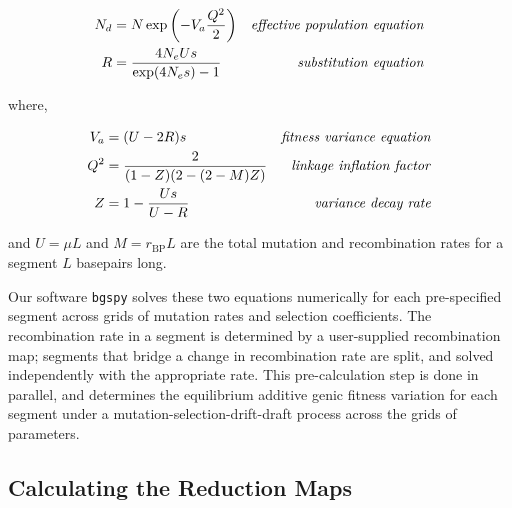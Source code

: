 \documentclass[11pt]{article}
\begin{document}
\begin{align}
  \label{eq:}
  {N}_{d} &= N \exp \left( -V_a \frac{Q^2}{2} \right) & \text{\emph{effective population equation}} \\
  R &= \frac{4N_eU s}{\exp(4 N_e s)-1}  & \text{\emph{substitution equation}} 
\end{align}

where,

\begin{align}
  V_a &= (U  - 2 R) s & \text{\emph{fitness variance equation}} \\
  Q^2 &= \frac{2}{(1-Z)(2-(2-M)Z)} & \text{\emph{linkage inflation factor}} \\
  Z &= 1 - \frac{Us}{U-{R}} & \text{\emph{variance decay rate}}
\end{align}

and $U = \mu L$ and $M = r_\text{BP} L$ are the total mutation and
recombination rates for a segment $L$ basepairs long. 


Our software \texttt{bgspy} solves these two equations numerically for each
pre-specified segment across grids of mutation rates and selection
coefficients. The recombination rate in a segment is determined by a
user-supplied recombination map; segments that bridge a change in recombination
rate are split, and solved independently with the appropriate rate. This
pre-calculation step is done in parallel, and determines the equilibrium
additive genic fitness variation for each segment under a
mutation-selection-drift-draft process across the grids of parameters.

\subsection*{Calculating the Reduction Maps}
\label{sec:methods-maps}
\end{document}

